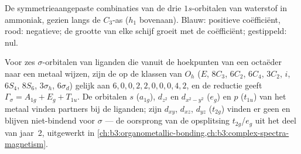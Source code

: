 \begin{omfigure}

{\small De symmetrieaangepaste combinaties van de drie $1s$-orbitalen van
waterstof in ammoniak, gezien langs de $C_3$-as ($h_1$ bovenaan). Blauw:
positieve coëfficiënt, rood: negatieve; de grootte van elke schijf groeit
met de coëfficiënt; gestippeld: nul.}
\end{omfigure}

\begin{example}\label{ex:b3:group-theory-applied:ml6}
Voor zes $\sigma$-orbitalen van liganden die vanuit de hoekpunten van een
octaëder naar een metaal wijzen, zijn de  op de klassen van $O_h$ ($E$, $8C_3$, $6C_2$, $6C_4$,
$3C_2$, $i$, $6S_4$, $8S_6$, $3\sigma_h$, $6\sigma_d$) gelijk aan $6, 0, 0, 2, 2, 0, 0, 0, 4,
2$, en de reductie geeft $\Gamma_\sigma = A_{1g} + E_g + T_{1u}$. De orbitalen
$s$
($a_{1g}$), $d_{z^2}$ en $d_{x^2-y^2}$ ($e_g$) en $p$ ($t_{1u}$) van het metaal
vinden partners bij de liganden; zijn $d_{xy}$, $d_{xz}$, $d_{yz}$
($t_{2g}$) vinden er geen en blijven niet-bindend
voor $\sigma$ --- de oorsprong van de opsplitsing $t_{2g}$/$e_g$ uit het
deel van jaar~2,
uitgewerkt in \cref{ch:b3:organometallic-bonding,ch:b3:complex-spectra-magnetism}.
\end{example}

